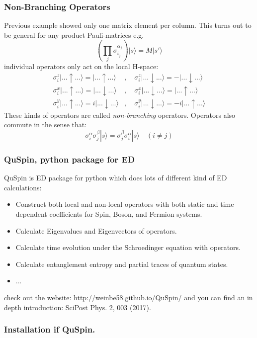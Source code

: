 \documentclass{beamer}
\newcommand\0{\scalebox{-1}[1]{0}}
\newcommand{\pz}{\sigma^z}
\newcommand{\px}{\sigma^x}
\newcommand{\py}{\sigma^y}
\begin{document}
\begin{frame}
\frametitle{Non-Branching Operators}
Previous example showed only one matrix element per column. This turns out to be general for any product Pauli-matrices e.g.
\begin{equation*}
	\left(\prod_j\sigma^{\alpha_j}_{i_j}\right)|s\rangle= M|s'\rangle
\end{equation*}
individual operators only act on the local H-space:
\begin{align*}
\pz_i|...\uparrow...\rangle= |...\uparrow...\rangle&,\quad \pz_i|...\downarrow...\rangle=-|...\downarrow...\rangle\\
\px_i|...\uparrow...\rangle=|...\downarrow...\rangle&,\quad\px_i|...\downarrow...\rangle=|...\uparrow...\rangle\\
\py_i|...\uparrow...\rangle=i|...\downarrow...\rangle&,\quad\py_i|...\downarrow...\rangle=-i|...\uparrow...\rangle
\end{align*}
These kinds of operators are called \emph{non-branching} operators. Operators also commute in the sense that:
\begin{equation}
\sigma^\alpha_i\sigma^\beta_j|s\rangle = \sigma^\beta_j\sigma^\alpha_i|s\rangle\quad (i\ne j)
\end{equation}
\end{frame}

\begin{frame}
\frametitle{QuSpin, python package for ED}
QuSpin is ED package for python which does lots of different kind of ED calculations:
\begin{itemize}
\item Construct both local and non-local operators with both static and time dependent coefficients for Spin, Boson, and Fermion systems.
\item Calculate Eigenvalues and Eigenvectors of operators.
\item Calculate time evolution under the Schroedinger equation with operators. 
\item Calculate entanglement entropy and partial traces of quantum states. 
\item ... 
\end{itemize}
check out the website: http://weinbe58.github.io/QuSpin/ and you can find an in depth introduction: SciPost Phys. 2, 003 (2017).

\end{frame}
\frametitle{Installation if QuSpin.}
\end{document}
